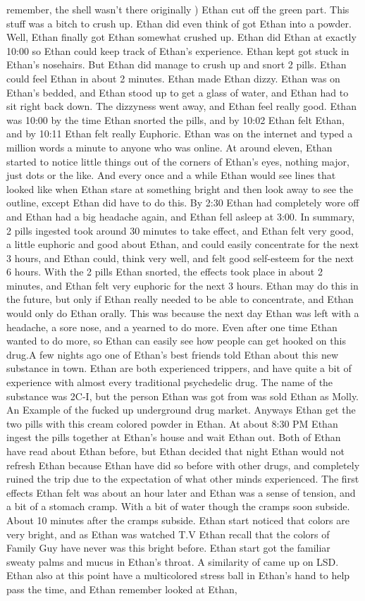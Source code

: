 \documentclass[12pt]{book}
\begin{document}
remember, the shell wasn't there originally ) Ethan cut off the green part. This stuff was a bitch to crush up. Ethan did even think of got Ethan into a powder. Well, Ethan finally got Ethan somewhat crushed up. Ethan did Ethan at exactly 10:00 so Ethan could keep track of Ethan's experience. Ethan kept got stuck in Ethan's nosehairs. But Ethan did manage to crush up and snort 2 pills. Ethan could feel Ethan in about 2 minutes. Ethan made Ethan dizzy. Ethan was on Ethan's bedded, and Ethan stood up to get a glass of water, and Ethan had to sit right back down. The dizzyness went away, and Ethan feel really good. Ethan was 10:00 by the time Ethan snorted the pills, and by 10:02 Ethan felt Ethan, and by 10:11 Ethan felt really Euphoric. Ethan was on the internet and typed a million words a minute to anyone who was online. At around eleven, Ethan started to notice little things out of the corners of Ethan's eyes, nothing major, just dots or the like. And every once and a while Ethan would see lines that looked like when Ethan stare at something bright and then look away to see the outline, except Ethan did have to do this. By 2:30 Ethan had completely wore off and Ethan had a big headache again, and Ethan fell asleep at 3:00. In summary, 2 pills ingested took around 30 minutes to take effect, and Ethan felt very good, a little euphoric and good about Ethan, and could easily concentrate for the next 3 hours, and Ethan could, think very well, and felt good self-esteem for the next 6 hours. With the 2 pills Ethan snorted, the effects took place in about 2 minutes, and Ethan felt very euphoric for the next 3 hours. Ethan may do this in the future, but only if Ethan really needed to be able to concentrate, and Ethan would only do Ethan orally. This was because the next day Ethan was left with a headache, a sore nose, and a yearned to do more. Even after one time Ethan wanted to do more, so Ethan can easily see how people can get hooked on this drug.A few nights ago one of Ethan's best friends told Ethan about this new substance in town. Ethan are both experienced trippers, and have quite a bit of experience with almost every traditional psychedelic drug. The name of the substance was 2C-I, but the person Ethan was got from was sold Ethan as Molly. An Example of the fucked up underground drug market. Anyways Ethan get the two pills with this cream colored powder in Ethan. At about 8:30 PM Ethan ingest the pills together at Ethan's house and wait Ethan out. Both of Ethan have read about Ethan before, but Ethan decided that night Ethan would not refresh Ethan because Ethan have did so before with other drugs, and completely ruined the trip due to the expectation of what other minds experienced. The first effects Ethan felt was about an hour later and Ethan was a sense of tension, and a bit of a stomach cramp. With a bit of water though the cramps soon subside. About 10 minutes after the cramps subside. Ethan start noticed that colors are very bright, and as Ethan was watched T.V Ethan recall that the colors of Family Guy have never was this bright before. Ethan start got the familiar sweaty palms and mucus in Ethan's throat. A similarity of came up on LSD. Ethan also at this point have a multicolored stress ball in Ethan's hand to help pass the time, and Ethan remember looked at Ethan, 
\end{document}
